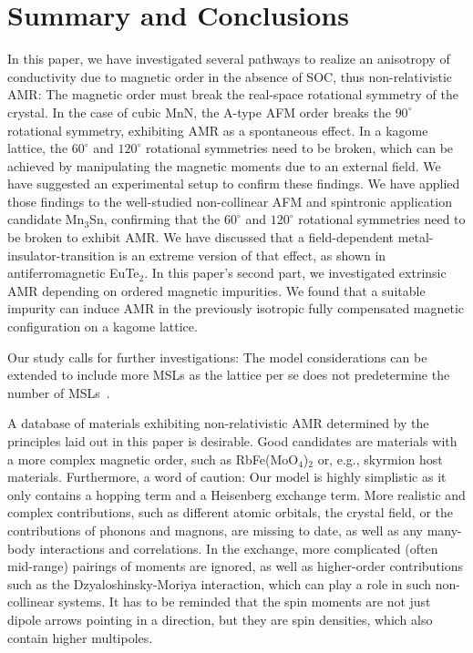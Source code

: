 \documentclass[prb,showpacs,amsmath,amssymb,superscriptaddress,twocolumn,floatfix]{revtex4-1}
\begin{document}
\section{Summary and Conclusions}
\label{sec_Sum}

In this paper, we have investigated several pathways to realize an anisotropy of conductivity due to magnetic order in the absence of SOC, thus non-relativistic AMR: The magnetic order must break the real-space rotational symmetry of the crystal. In the case of cubic MnN, the A-type AFM order breaks the $90^\circ$ rotational symmetry, exhibiting AMR as a spontaneous effect. In a kagome lattice, the $60^\circ$ and $120^\circ$ rotational symmetries need to be broken, which can be achieved by manipulating the magnetic moments due to an external field. We have suggested an experimental setup to confirm these findings. We have applied those findings to the well-studied non-collinear AFM and spintronic application candidate Mn$_3$Sn, confirming that the $60^\circ$ and $120^\circ$ rotational symmetries need to be broken to exhibit AMR. We have discussed that a field-dependent metal-insulator-transition is an extreme version of that effect, as shown in antiferromagnetic EuTe$_2$. In this paper's second part, we investigated extrinsic AMR depending on ordered magnetic impurities. We found that a suitable impurity can induce AMR in the previously isotropic fully compensated magnetic configuration on a kagome lattice.

Our study calls for further investigations: The model considerations can be extended to include more MSLs as the lattice per se does not predetermine the number of MSLs~\cite{Hayami:2020, Rusnacko:2019}.

A database of materials exhibiting non-relativistic AMR determined by the principles laid out in this paper is desirable. Good candidates are materials with a more complex magnetic order, such as RbFe(MoO$_4$)$_2$ or, e.g., skyrmion host materials. Furthermore, a word of caution: Our model is highly simplistic as it only contains a hopping term and a Heisenberg exchange term. More realistic and complex contributions, such as different atomic orbitals, the crystal field, or the contributions of phonons and magnons, are missing to date, as well as any many-body interactions and correlations. In the exchange, more complicated (often mid-range) pairings of moments are ignored, as well as higher-order contributions such as the Dzyaloshinsky-Moriya interaction, which can play a role in such non-collinear systems. It has to be reminded that the spin moments are not just dipole arrows pointing in a direction, but they are spin densities, which also contain higher multipoles.
\end{document}
